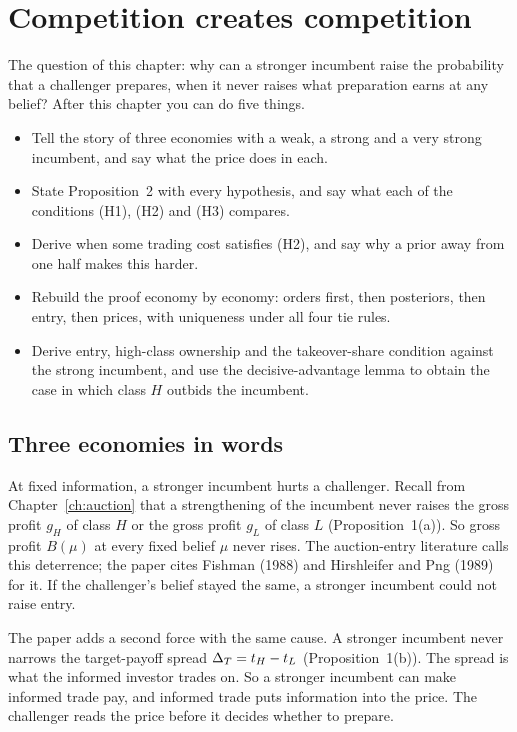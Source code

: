 \chapter{Competition creates competition}\label{ch:ccc}

\begin{chapterplan}
The question of this chapter: why can a stronger incumbent raise the probability that a challenger prepares,
when it never raises what preparation earns at any belief? After this chapter you can do five things.
\begin{itemize}
\item Tell the story of three economies with a weak, a strong and a very strong incumbent, and say what the
  price does in each.
\item State Proposition~2 with every hypothesis, and say what each of the conditions (H1), (H2) and (H3) compares.
\item Derive when some trading cost satisfies (H2), and say why a prior away from one half makes this harder.
\item Rebuild the proof economy by economy: orders first, then posteriors, then entry, then prices, with
  uniqueness under all four tie rules.
\item Derive entry, high-class ownership and the takeover-share condition against the strong incumbent, and use
  the decisive-advantage lemma to obtain the case in which class \(H\) outbids the incumbent.
\end{itemize}
\end{chapterplan}

\section{Three economies in words}\label{sec:ccc-story}

At fixed information, a stronger incumbent hurts a challenger. Recall from
Chapter~\ref{ch:auction} that a strengthening of the incumbent never raises the gross profit \(g_H\) of class
\(H\) or the gross profit \(g_L\) of class \(L\) (Proposition~1(a)). So gross profit \(B(\mu)\) at every fixed
belief \(\mu\) never rises. The auction-entry literature calls this deterrence; the paper cites Fishman (1988)
and Hirshleifer and Png (1989) for it. If the challenger's belief stayed the same, a stronger incumbent could not
raise entry.

The paper adds a second force with the same cause. A stronger incumbent never narrows the target-payoff spread
\(\Delta_T=t_H-t_L\) (Proposition~1(b)). The spread is what the informed investor trades on. So a stronger incumbent can
make informed trade pay, and informed trade puts information into the price. The challenger reads the price
before it decides whether to prepare.

